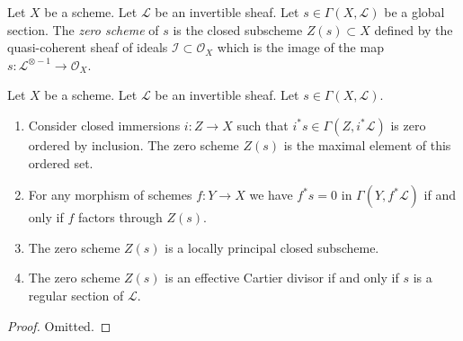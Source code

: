 \begin{definition}
\label{definition-zero-scheme-s}
Let $X$ be a scheme. Let $\mathcal{L}$ be an invertible sheaf.
Let $s \in \Gamma(X, \mathcal{L})$ be a global section.
The {\it zero scheme} of $s$ is the closed subscheme $Z(s) \subset X$
defined by the quasi-coherent sheaf of ideals
$\mathcal{I} \subset \mathcal{O}_X$ which is the image of the
map $s : \mathcal{L}^{\otimes -1} \to \mathcal{O}_X$.
\end{definition}

\begin{lemma}
\label{lemma-zero-scheme}
Let $X$ be a scheme.
Let $\mathcal{L}$ be an invertible sheaf.
Let $s \in \Gamma(X, \mathcal{L})$.
\begin{enumerate}
\item Consider closed immersions $i : Z \to X$ such that
$i^*s \in \Gamma(Z, i^*\mathcal{L})$ is zero
ordered by inclusion. The zero scheme $Z(s)$ is the
maximal element of this ordered set.
\item For any morphism of schemes $f : Y \to X$ we have
$f^*s = 0$ in $\Gamma(Y, f^*\mathcal{L})$ if and only if
$f$ factors through $Z(s)$.
\item The zero scheme $Z(s)$ is a locally principal closed subscheme.
\item The zero scheme $Z(s)$ is an effective Cartier divisor
if and only if $s$ is a regular section of $\mathcal{L}$.
\end{enumerate}
\end{lemma}

\begin{proof}
Omitted.
\end{proof}

